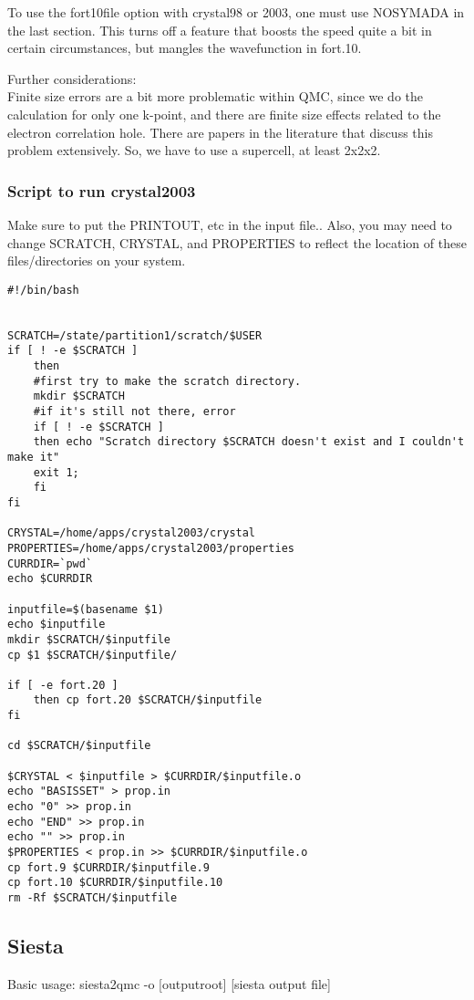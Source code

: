 \documentclass[12pt]{article}
\begin{document}
To use the fort10file option with crystal98 or 2003, one must use NOSYMADA in
the last section.  This turns off a feature that boosts the speed quite a bit in certain circumstances, but
mangles the wavefunction in fort.10.  

Further considerations:\\
Finite size errors are a bit more problematic within QMC, since we do the calculation for only one
k-point, and there are finite size effects related to the electron correlation hole.  There are papers in the literature that discuss this problem extensively.
So, we have to use a supercell, at least  2x2x2.



\subsubsection{Script to run crystal2003}

Make sure to put the PRINTOUT, etc in the input file..  Also, you may need to change SCRATCH, CRYSTAL, and 
PROPERTIES to reflect the location of these files/directories on your system.
\begin{verbatim}
#!/bin/bash


SCRATCH=/state/partition1/scratch/$USER
if [ ! -e $SCRATCH ]
    then
    #first try to make the scratch directory.
    mkdir $SCRATCH
    #if it's still not there, error
    if [ ! -e $SCRATCH ]
    then echo "Scratch directory $SCRATCH doesn't exist and I couldn't make it"
    exit 1;
    fi
fi

CRYSTAL=/home/apps/crystal2003/crystal
PROPERTIES=/home/apps/crystal2003/properties
CURRDIR=`pwd`
echo $CURRDIR

inputfile=$(basename $1)
echo $inputfile
mkdir $SCRATCH/$inputfile
cp $1 $SCRATCH/$inputfile/

if [ -e fort.20 ]
    then cp fort.20 $SCRATCH/$inputfile
fi

cd $SCRATCH/$inputfile

$CRYSTAL < $inputfile > $CURRDIR/$inputfile.o
echo "BASISSET" > prop.in
echo "0" >> prop.in
echo "END" >> prop.in
echo "" >> prop.in
$PROPERTIES < prop.in >> $CURRDIR/$inputfile.o
cp fort.9 $CURRDIR/$inputfile.9
cp fort.10 $CURRDIR/$inputfile.10
rm -Rf $SCRATCH/$inputfile
\end{verbatim}

\newpage
\subsection{Siesta}
Basic usage: siesta2qmc -o [outputroot]  [siesta output file] 
\end{document}
